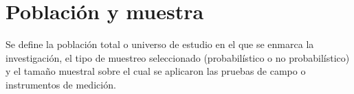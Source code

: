 \section{Población y muestra}
\label{sec:poblacion_muestra}

Se define la población total o universo de estudio en el que se enmarca la investigación, el tipo de muestreo seleccionado (probabilístico o no probabilístico) y el tamaño muestral sobre el cual se aplicaron las pruebas de campo o instrumentos de medición.
